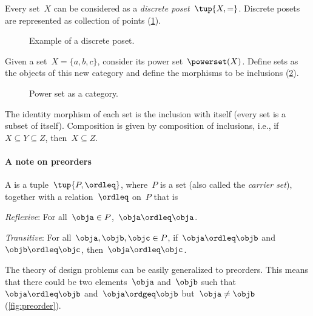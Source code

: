 \begin{example}
    \label{ex:discreteposet}
    Every set~$X$ can be considered as a \emph{discrete poset}~$\tup{X,=}$. Discrete posets are represented as collection of points (\cref{fig:discretepos}).

    \begin{figure}[tbh]
        \centering
        \caption{Example of a discrete poset. \label{fig:discretepos}}
    \end{figure}

    \begin{example}
        \label{ex:hasseinclusion}
        Given a set~$X=\{a,b,c\}$, consider its power set~$\powerset(X)$. Define sets as the objects of this new category and define the morphisms to be inclusions (\cref{fig:powersetcat}).

        \begin{figure}[h!]
            \begin{center}
            \end{center}
            \caption{Power set as a category. \label{fig:powersetcat}}
        \end{figure}

        The identity morphism of each set is the inclusion with itself (every set is a subset of itself). Composition is given by composition of inclusions, i.e., if~$X\subseteq Y \subseteq Z$, then~$X\subseteq Z$.
    \end{example}
\end{example}

\paragraph{A note on preorders}
\begin{definition}[Preorder]
    \label{def:preorder}
    A \emph{} is a tuple~$\tup{P, \ordleq}$,
    where~$P$ is a set (also called the \emph{carrier set}), together with a
    relation~$\ordleq$ on~$P$ that is
    \begin{compactenum}
        \item \emph{Reflexive}: For all~$\obja\in P$,~$\obja\ordleq \obja$.
        \item \emph{Transitive}: For all~$\obja,\objb,\objc\in P$, if~$\obja\ordleq \objb$ and~$\objb\ordleq \objc$, then~$\obja\ordleq \objc$.
    \end{compactenum}
\end{definition}
The theory of design problems can be easily generalized to preorders. This means that there could be two elements~$\obja$ and~$\objb$ such that~$\obja\ordleq \objb$ and~$\obja \ordgeq \objb$ but~$\obja \neq \objb$ (\cref{fig:preorder}).


